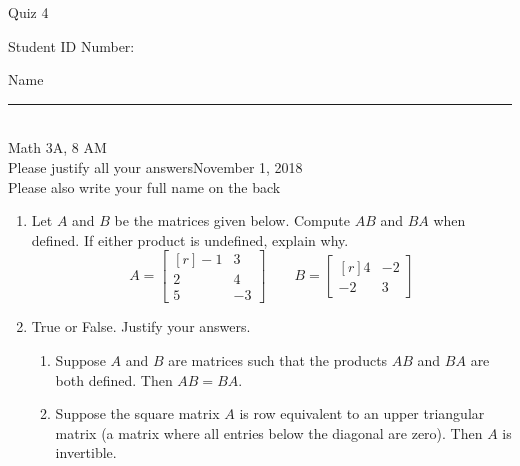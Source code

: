 \documentclass[12pt]{article}
\begin{document}
\begin{flushleft} 
\centerline{\LARGE{Quiz 4}} 
\vspace{5 mm}
{Student ID Number:}\hfill  
{Name \rule {2 in}{0.01in}}\\
Math 3A, 8 AM
\\
{Please justify all your answers}\hfill {November 1, 2018}
\\
{Please also write your full name on the back} 

\medskip
\end{flushleft}

\begin{enumerate}
	\item Let $A$ and $B$ be the matrices given below. Compute $AB$ and $BA$ when defined. If either product is undefined, explain why.
	\[
	A = \begin{bmatrix*}[r]
		-1 & 3\\
		2 & 4\\
		5 & -3
	\end{bmatrix*}\qquad
	B = \begin{bmatrix*}[r]
		4 & -2\\
		-2 & 3
	\end{bmatrix*}
	\]
	\vfill


	\item True or False. Justify your answers.
	\begin{enumerate}
		\item Suppose $A$ and $B$ are matrices such that the products $AB$ and $BA$ are both defined. Then $AB = BA$.

		\vfill

		\item Suppose the square matrix $A$ is row equivalent to an upper triangular matrix (a matrix where all entries below the diagonal are zero). Then $A$ is invertible.

		\vfill
	\end{enumerate}
\end{enumerate}

\end{document}

